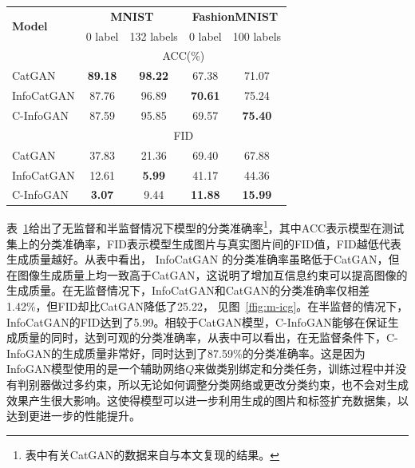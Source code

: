 \begin{table}[hbtp]
  \renewcommand\arraystretch{0.8} %
  \centering
  \label{tab:acc}
  \begin{tabular}{lcccc}
    \toprule
    \multirow{2}{*}{\bf Model} & \multicolumn{2}{c}{\bf MNIST} & \multicolumn{2}{c}{\bf FashionMNIST}\\
    \cline{2-5}
                           & 0 label & 132 labels & 0 label & 100 labels \\ \hline
    ~ & \multicolumn{4}{c}{ACC(\%)} \\ \hline
    CatGAN & \textbf{89.18} & \textbf{98.22} & 67.38 & 71.07  \\
    InfoCatGAN & 87.76 & 96.89 & \textbf{70.61} & 75.24  \\
    C-InfoGAN & 87.59 & 95.85 & 69.57 & \textbf{75.40}   \\
    \hline\hline
    ~ & \multicolumn{4}{c}{FID} \\ \hline
    CatGAN & 37.83 & 21.36 & 69.40 & 67.88  \\
    InfoCatGAN & 12.61 & \textbf{5.99} & 41.17 & 44.36  \\
    C-InfoGAN & \textbf{3.07} & 9.44 & \textbf{11.88} & \textbf{15.99}   \\
    \bottomrule
  \end{tabular}
\end{table}

表~\ref{tab:acc}给出了无监督和半监督情况下模型的分类准确率\footnote{表中有关CatGAN的数据来自与本文复现的结果。}，其中ACC表示模型在测试集上的分类准确率，FID表示模型生成图片与真实图片间的FID值，FID越低代表生成质量越好。从表中看出，
InfoCatGAN 的分类准确率虽略低于CatGAN，但在图像生成质量上均一致高于CatGAN，这说明了增加互信息约束可以提高图像的生成质量。在无监督情况下，InfoCatGAN和CatGAN的分类准确率仅相差1.42\%，但FID却比CatGAN降低了25.22，
见图~\ref{ffig:m-icg}。在半监督的情况下，InfoCatGAN的FID达到了5.99。相较于CatGAN模型，C-InfoGAN能够在保证生成质量的同时，达到可观的分类准确率，从表中可以看出，在无监督条件下，C-InfoGAN的生成质量非常好，同时达到了87.59\%的分类准确率。这是因为InfoGAN模型使用的是一个辅助网络$Q$来做类别绑定和分类任务，训练过程中并没有判别器做过多约束，所以无论如何调整分类网络或更改分类约束，也不会对生成效果产生很大影响。这使得模型可以进一步利用生成的图片和标签扩充数据集，以达到更进一步的性能提升。

